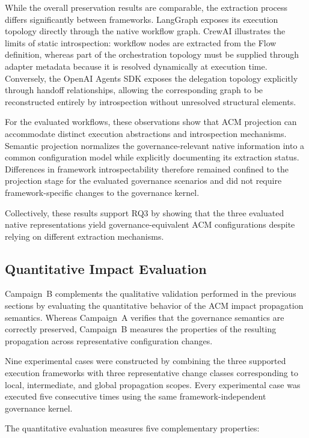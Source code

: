 \documentclass[10pt]{article}
\begin{document}
While the overall preservation results are comparable, the extraction process differs significantly between frameworks. LangGraph exposes its execution topology directly through the native workflow graph. CrewAI illustrates the limits of static introspection: workflow nodes are extracted from the Flow definition, whereas part of the orchestration topology must be supplied through adapter metadata because it is resolved dynamically at execution time. Conversely, the OpenAI Agents SDK exposes the delegation topology explicitly through handoff relationships, allowing the corresponding graph to be reconstructed entirely by introspection without unresolved structural elements.

For the evaluated workflows, these observations show that ACM projection can accommodate distinct execution abstractions and introspection mechanisms. Semantic projection normalizes the governance-relevant native information into a common configuration model while explicitly documenting its extraction status. Differences in framework introspectability therefore remained confined to the projection stage for the evaluated governance scenarios and did not require framework-specific changes to the governance kernel.

Collectively, these results support RQ3 by showing that the three evaluated native representations yield governance-equivalent ACM configurations despite relying on different extraction mechanisms.

\subsection{Quantitative Impact Evaluation}
\label{sec:quantitative_impact}

Campaign~B complements the qualitative validation performed in the previous sections by evaluating the quantitative behavior of the ACM impact propagation semantics. Whereas Campaign~A verifies that the governance semantics are correctly preserved, Campaign~B measures the properties of the resulting propagation across representative configuration changes.

Nine experimental cases were constructed by combining the three supported execution frameworks with three representative change classes corresponding to local, intermediate, and global propagation scopes. Every experimental case was executed five consecutive times using the same framework-independent governance kernel.

The quantitative evaluation measures five complementary properties:
\end{document}
